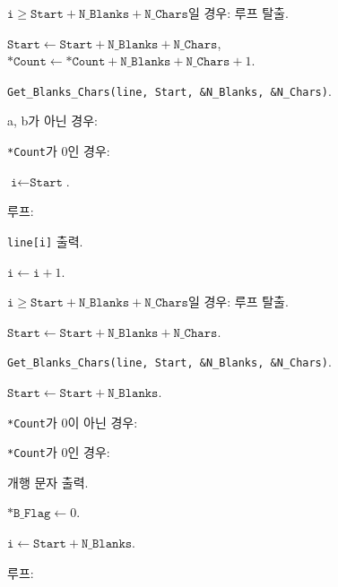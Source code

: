 \documentclass[runningheads]{../../../llncs}
\begin{document}
\begin{algorithm}
\begin{algorithm}
\begin{algorithm}
\begin{algorithm}
								\item $\texttt{i} \geq \texttt{Start} + \texttt{N_Blanks} + \texttt{N_Chars}$일 경우: 루프 탈출.
							\end{algorithm}
						\item $\texttt{Start} \leftarrow \texttt{Start} + \texttt{N_Blanks} + \texttt{N_Chars}$, $\texttt{*Count} \leftarrow \texttt{*Count} + \texttt{N_Blanks} + \texttt{N_Chars} + 1$.
						\item \texttt{Get_Blanks_Chars(line, Start, \&N_Blanks, \&N_Chars)}.
 					\end{algorithm}
 				\item a, b가 아닌 경우:
 					\begin{algorithm}
						\item \texttt{*Count}가 0인 경우:
							\begin{algorithm}
								\item $\texttt{i} \leftarrow \texttt{Start}$.
								\item 루프:
									\begin{algorithm}
										\item \texttt{line[i]} 출력.
										\item $\texttt{i} \leftarrow \texttt{i} + 1$.
										\item $\texttt{i} \geq \texttt{Start} + \texttt{N_Blanks} + \texttt{N_Chars}$일 경우: 루프 탈출.
									\end{algorithm}
								\item $\texttt{Start} \leftarrow \texttt{Start} + \texttt{N_Blanks} + \texttt{N_Chars}$.
								\item \texttt{Get_Blanks_Chars(line, Start, \&N_Blanks, \&N_Chars)}.
								\item $\texttt{Start} \leftarrow \texttt{Start} + \texttt{N_Blanks}$.
							\end{algorithm}
						\item \texttt{*Count}가 0이 아닌 경우:
							\item \texttt{*Count}가 0인 경우:
							\begin{algorithm}
								\item 개행 문자 출력.
								\item $\texttt{*B_Flag} \leftarrow 0$.
 								\item \item $\texttt{i} \leftarrow \texttt{Start} + \texttt{N_Blanks}$.
								\item 루프:
									\begin{algorithm}

\end{algorithm}
\end{algorithm}
\end{algorithm}
\end{algorithm}
\end{algorithm}
\end{document}
